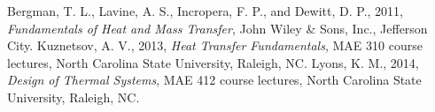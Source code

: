 \documentclass{article}
\begin{document}
\begin{thebibliography}{99}
 Bergman, T. L., Lavine, A. S., Incropera, F. P., and Dewitt, D. P., 2011,
  \emph{Fundamentals of Heat and Mass Transfer}, John Wiley \& Sons, Inc., Jefferson City.
 Kuznetsov, A. V., 2013, \emph{Heat Transfer Fundamentals}, MAE 310 course lectures,
  North Carolina State University, Raleigh, NC.
 Lyons, K. M., 2014, \emph{Design of Thermal Systems}, MAE 412 course lectures,
  North Carolina State University, Raleigh, NC.
\end{thebibliography}
\end{document}
